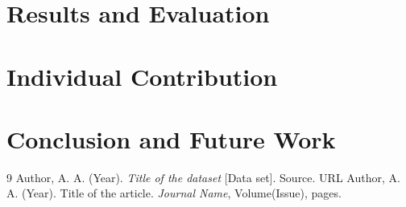 \documentclass[12pt]{article}
\begin{document}
\section{Results and Evaluation}

\section{Individual Contribution}

\section{Conclusion and Future Work}

\begin{thebibliography}{9}
 Author, A. A. (Year). \textit{Title of the dataset} [Data set]. Source. URL
 Author, A. A. (Year). Title of the article. \textit{Journal Name}, Volume(Issue), pages.
\end{thebibliography}
\end{document}
